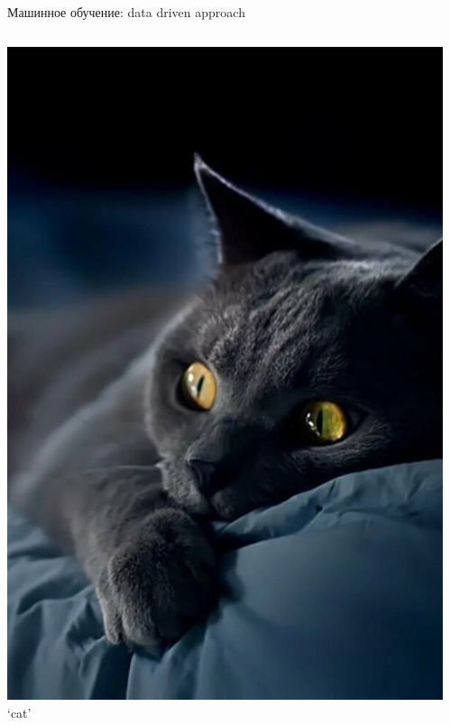 \documentclass[aspectratio=169, professionalfonts]{beamer}
\begin{document}
\begin{frame}{Машинное обучение: data driven approach}
\begin{columns}
\begin{column}{.1\linewidth}
            \includegraphics[width=\linewidth]{figures/fig32-dataset-sample.jpg}
            `cat'
        \end{column}
        \begin{column}{.1\linewidth}
            \centering

\end{column}
\end{columns}
\end{frame}
\end{document}
